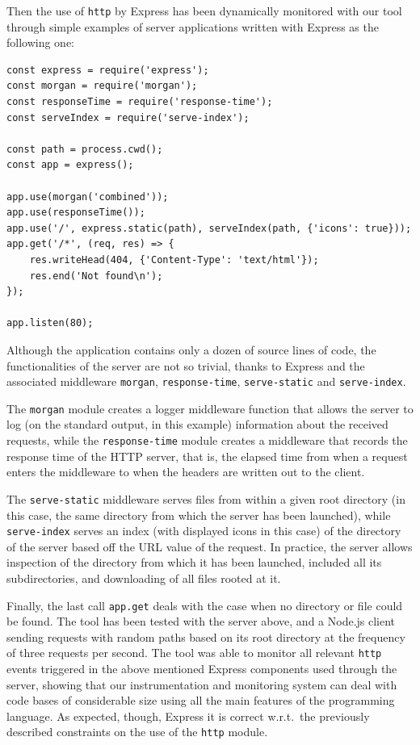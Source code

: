 Then the use of \lstinline{http} by Express has been dynamically monitored with our tool through simple
examples of server applications written with Express as the following one:
\begin{lstlisting}
const express = require('express');
const morgan = require('morgan');
const responseTime = require('response-time');
const serveIndex = require('serve-index');

const path = process.cwd();
const app = express();

app.use(morgan('combined'));
app.use(responseTime());
app.use('/', express.static(path), serveIndex(path, {'icons': true}));
app.get('/*', (req, res) => {
    res.writeHead(404, {'Content-Type': 'text/html'});
    res.end('Not found\n');
});

app.listen(80);
\end{lstlisting}
Although the application contains only a dozen of source lines of code, the
functionalities of the server are not so trivial, thanks to Express and the
associated middleware \lstinline{morgan}, \lstinline{response-time}, \lstinline{serve-static} and
\lstinline{serve-index}.

The \lstinline{morgan} module creates a logger middleware function that allows the server to log (on the standard output, in this example)
information about the received requests, while the \lstinline{response-time} module
creates a middleware that records the response time of the HTTP server, that is, the elapsed time from when a
request enters the middleware to when the headers are written out to the client.

The  \lstinline{serve-static} middleware serves files from within a given root directory (in this case, the same directory
from which the server has been launched), while \lstinline{serve-index} serves an index (with displayed icons in this case)
of the directory of the server based off the URL value of the request. In practice, the server allows inspection of the directory
from which it has been launched, included all its subdirectories, and downloading of all files rooted at it. 

Finally, the last call \lstinline{app.get} deals with the case when no directory or file could be found.
The tool has been tested with the server above, and a Node.js client sending requests with random  paths based on its root directory at the frequency of three requests per second.
The tool was able to monitor all relevant \lstinline{http} events triggered in the above mentioned Express components used through the server, showing that our instrumentation and monitoring system can deal with code bases of considerable size using all the main features of the programming language.
As expected, though, Express it is correct w.r.t.\ the previously described constraints on the use of the \lstinline{http} module.



